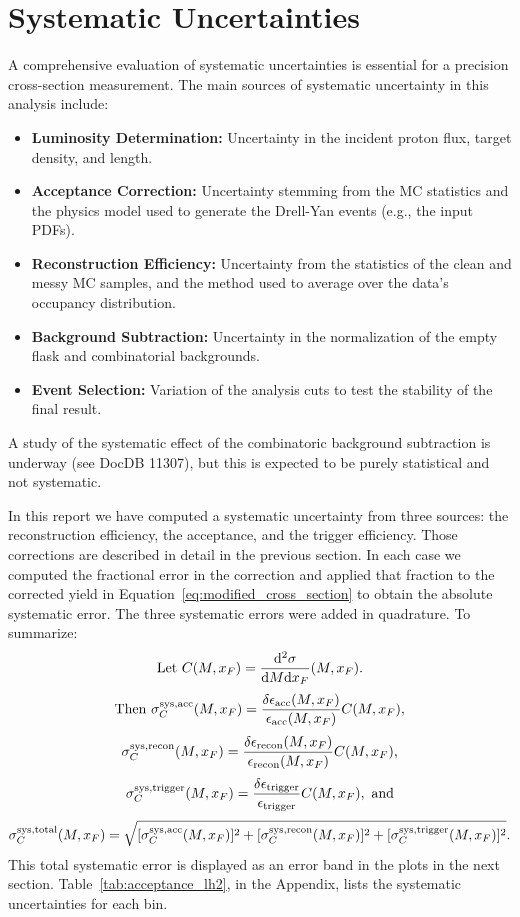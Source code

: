 \documentclass[11pt]{article}
\newcommand{\diffd}{\mathrm{d}}
\begin{document}
\FloatBarrier

\section{Systematic Uncertainties}
\label{sec:systematics}
A comprehensive evaluation of systematic uncertainties is essential for a precision cross-section measurement. The main sources of systematic uncertainty in this analysis include:
\begin{itemize}
    \item \textbf{Luminosity Determination:} Uncertainty in the incident proton flux, target density, and length.
    \item \textbf{Acceptance Correction:} Uncertainty stemming from the MC statistics and the physics model used to generate the Drell-Yan events (e.g., the input PDFs).
    \item \textbf{Reconstruction Efficiency:} Uncertainty from the statistics of the clean and messy MC samples, and the method used to average over the data's occupancy distribution.
    \item \textbf{Background Subtraction:} Uncertainty in the normalization of the empty flask and combinatorial backgrounds.
    \item \textbf{Event Selection:} Variation of the analysis cuts to test the stability of the final result.
\end{itemize}
A study of the systematic effect of the combinatoric background subtraction is underway (see DocDB 11307), but this is expected to be purely statistical and not systematic.  

In this report we have computed a systematic uncertainty from three sources: the reconstruction efficiency, the acceptance, and the trigger efficiency.  Those corrections are described in detail in the previous section.  In each case we computed the fractional error in the correction and applied that fraction to the corrected yield in Equation~\ref{eq:modified_cross_section} to obtain the absolute systematic error.  The three systematic errors were added in quadrature.  To summarize:
$${\rm Let~}C(M,x_F) = \frac{\diffd^{2}\sigma}{\diffd M \diffd x_{F}} (M,x_F).$$
$${\rm Then~}\sigma_C^{\rm sys,acc}(M,x_F)=\frac{\delta\epsilon_{\rm acc}(M,x_F)}{\epsilon_{\rm acc}(M,x_F)}C(M,x_F),$$
$$\sigma_C^{\rm sys,recon}(M,x_F)=\frac{\delta\epsilon_{\rm recon}(M,x_F)}{\epsilon_{\rm recon}(M,x_F)}C(M,x_F),$$
$$\sigma_C^{\rm sys,trigger}(M,x_F)=\frac{\delta\epsilon_{\rm trigger}}{\epsilon_{\rm trigger}}C(M,x_F),{\rm~and}$$
$$\sigma_C^{\rm sys,total}(M,x_F)=\sqrt{[\sigma_C^{\rm sys,acc}(M,x_F)]^2+[\sigma_C^{\rm sys,recon}(M,x_F)]^2+[\sigma_C^{\rm sys,trigger}(M,x_F)]^2}.$$
This total systematic error is displayed as an error band in the plots in the next section.  Table~\ref{tab:acceptance_lh2}, in the Appendix, lists the systematic uncertainties for each bin.
\end{document}
